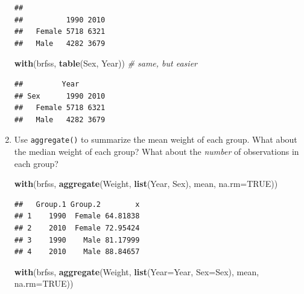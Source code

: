 \documentclass[]{article}
\newenvironment{Shaded}{\begin{snugshade}}{\end{snugshade}}
\newcommand{\KeywordTok}[1]{\textcolor[rgb]{0.13,0.29,0.53}{\textbf{#1}}}
\newcommand{\DataTypeTok}[1]{\textcolor[rgb]{0.13,0.29,0.53}{#1}}
\newcommand{\CommentTok}[1]{\textcolor[rgb]{0.56,0.35,0.01}{\textit{#1}}}
\newcommand{\OtherTok}[1]{\textcolor[rgb]{0.56,0.35,0.01}{#1}}
\newcommand{\OperatorTok}[1]{\textcolor[rgb]{0.81,0.36,0.00}{\textbf{#1}}}
\newcommand{\NormalTok}[1]{#1}
\theoremstyle{definition}
\theoremstyle{definition}
\theoremstyle{remark}
\begin{document}
\begin{enumerate}
\begin{Shaded}
\end{Shaded}

\begin{verbatim}
##         
##          1990 2010
##   Female 5718 6321
##   Male   4282 3679
\end{verbatim}

\begin{Shaded}
\begin{Highlighting}[]
\KeywordTok{with}\NormalTok{(brfss, }\KeywordTok{table}\NormalTok{(Sex, Year))                }\CommentTok{# same, but easier}
\end{Highlighting}
\end{Shaded}

\begin{verbatim}
##         Year
## Sex      1990 2010
##   Female 5718 6321
##   Male   4282 3679
\end{verbatim}
\item
  Use \texttt{aggregate()} to summarize the mean weight of each group.
  What about the median weight of each group? What about the
  \emph{number} of observations in each group?

\begin{Shaded}
\begin{Highlighting}[]
\KeywordTok{with}\NormalTok{(brfss, }\KeywordTok{aggregate}\NormalTok{(Weight, }\KeywordTok{list}\NormalTok{(Year, Sex), mean, }\DataTypeTok{na.rm=}\OtherTok{TRUE}\NormalTok{))}
\end{Highlighting}
\end{Shaded}

\begin{verbatim}
##   Group.1 Group.2        x
## 1    1990  Female 64.81838
## 2    2010  Female 72.95424
## 3    1990    Male 81.17999
## 4    2010    Male 88.84657
\end{verbatim}

\begin{Shaded}
\begin{Highlighting}[]
\KeywordTok{with}\NormalTok{(brfss, }\KeywordTok{aggregate}\NormalTok{(Weight, }\KeywordTok{list}\NormalTok{(}\DataTypeTok{Year=}\NormalTok{Year, }\DataTypeTok{Sex=}\NormalTok{Sex), mean, }\DataTypeTok{na.rm=}\OtherTok{TRUE}\NormalTok{))}
\end{Highlighting}
\end{Shaded}


\end{enumerate}
\end{document}
